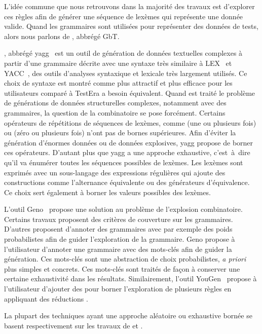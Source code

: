 L'idée commune que nous retrouvons dans la majorité des travaux est d'explorer
ces règles afin de générer une {\strong séquence de lexèmes} qui représente une
donnée valide. Quand les grammaires sont utilisées pour représenter des données
de tests, alors nous parlons de , abbrégé GbT.

, abbrégé yagg~ est
un outil de génération de données textuelles complexes à partir d'une grammaire
décrite avec une syntaxe très similaire à LEX~ et
YACC~, des outils d'analyses syntaxique et lexicale très
largement utilisés. Ce choix de syntaxe est montré comme plus attractif et plus
efficace pour les utilisateurs comparé à TestEra a besoin équivalent. Quand est
traité le problème de générations de données structurelles complexes, notamment
avec des grammaires, la question de la combinatoire se pose forcément. Certains
opérateurs de répétitions de séquences de lexèmes, comme \code{+} (une ou
plusieurs fois) ou \code{*} (zéro ou plusieurs fois) n'ont pas de bornes
supérieures. Afin d'éviter la génération d'énormes données ou de données
explosives, yagg propose de borner ces opérateurs. D'autant plus que yagg a une
approche exhaustive, c'est~à~dire qu'il va énumérer toutes les séquences
possibles de lexèmes.  Les lexèmes sont exprimés avec un sous-langage des
expressions régulières qui ajoute des constructions comme l'alternance
équivalente ou des générateurs d'équivalence.  Ce choix sert également à borner
les valeurs possibles des lexèmes.

L'outil Geno~ propose une solution au problème de l'explosion
combinatoire. Certains travaux proposent des critères de couverture sur les
grammaires. D'autres proposent d'annoter des grammaires avec par exemple des
poids probabilistes afin de guider l'exploration de la grammaire. Geno propose à
l'utilisateur d'annoter une grammaire avec des mots-clés afin de guider la
génération. Ces mots-clés sont une abstraction de choix probabilistes, {\em a
priori} plus simples et concrets. Ces mots-clés sont traités de façon à
conserver une certaine exhaustivité dans les résultats. Similairement, l'outil
YouGen~ propose à l'utilisateur d'ajouter des
 pour borner l'exploration de plusieurs règles en appliquant des
réductions .

La plupart des techniques ayant une approche aléatoire ou exhaustive bornée se
basent respectivement sur les travaux de  et
.

